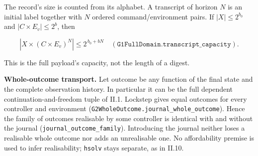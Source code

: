 \documentclass[
]{article}
\begin{document}
The record's size is counted from its alphabet. A transcript of horizon
\(N\) is an initial label together with \(N\) ordered
c\allowbreak{}o\allowbreak{}m\allowbreak{}m\allowbreak{}a\allowbreak{}n\allowbreak{}d\allowbreak{}/\allowbreak{}e\allowbreak{}n\allowbreak{}v\allowbreak{}i\allowbreak{}r\allowbreak{}o\allowbreak{}n\allowbreak{}m\allowbreak{}e\allowbreak{}n\allowbreak{}t
pairs. If \(|X|\le2^{b_0}\) and \(|C\times E_v|\le2^{b}\), then

\[
|X\times(C\times E_v)^N|\le2^{\,b_0+bN}
\quad(\texttt{G1FullDomain.transcript\_capacity}).
\]

This is the full payload's capacity, not the length of a digest.

\textbf{Whole-outcome transport.} Let \(\mathrm{outcome}\) be any
function of the final state and the complete observation history. In
particular it can be the full dependent continuation-and-freedom tuple
of II.1. Lockstep gives equal outcomes for every controller and
environment
(\texttt{G\allowbreak{}2\allowbreak{}W\allowbreak{}h\allowbreak{}o\allowbreak{}l\allowbreak{}e\allowbreak{}O\allowbreak{}u\allowbreak{}t\allowbreak{}c\allowbreak{}o\allowbreak{}m\allowbreak{}e\allowbreak{}.\allowbreak{}j\allowbreak{}o\allowbreak{}u\allowbreak{}r\allowbreak{}n\allowbreak{}a\allowbreak{}l\allowbreak{}\_\allowbreak{}w\allowbreak{}h\allowbreak{}o\allowbreak{}l\allowbreak{}e\allowbreak{}\_\allowbreak{}o\allowbreak{}u\allowbreak{}t\allowbreak{}c\allowbreak{}o\allowbreak{}m\allowbreak{}e}).
Hence the family of outcomes realisable by some controller is identical
with and without the journal
(\texttt{j\allowbreak{}o\allowbreak{}u\allowbreak{}r\allowbreak{}n\allowbreak{}a\allowbreak{}l\allowbreak{}\_\allowbreak{}o\allowbreak{}u\allowbreak{}t\allowbreak{}c\allowbreak{}o\allowbreak{}m\allowbreak{}e\allowbreak{}\_\allowbreak{}f\allowbreak{}a\allowbreak{}m\allowbreak{}i\allowbreak{}l\allowbreak{}y}).
Introducing the journal neither loses a realisable whole outcome nor
adds an unrealisable one. No affordability premise is used to infer
realisability; \texttt{hsolv} stays separate, as in II.10.
\end{document}
